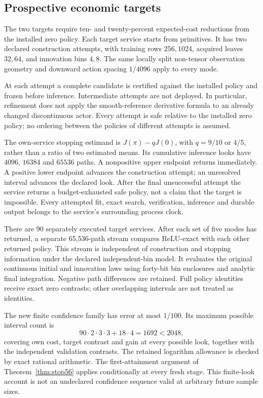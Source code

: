 \subsection{Prospective economic targets}
The two targets require ten- and twenty-percent expected-cost reductions from the installed zero policy. Each target service starts from primitives. It has two declared construction attempts, with training rows $256,1024$, acquired leaves $32,64$, and innovation bins $4,8$. The same locally split non-tensor observation geometry and downward action spacing $1/4096$ apply to every mode.

At each attempt a complete candidate is certified against the installed policy and frozen before inference. Intermediate attempts are not deployed. In particular, refinement does not apply the smooth-reference derivative formula to an already changed discontinuous actor. Every attempt is safe relative to the installed zero policy; no ordering between the policies of different attempts is assumed.

The own-service stopping estimand is $J(\pi)-qJ(0)$, with $q=9/10$ or $4/5$, rather than a ratio of two estimated means. Its cumulative inference looks have $4096$, $16384$ and $65536$ paths. A nonpositive upper endpoint returns immediately. A positive lower endpoint advances the construction attempt; an unresolved interval advances the declared look. After the final unsuccessful attempt the service returns a budget-exhausted safe policy, not a claim that the target is impossible. Every attempted fit, exact search, verification, inference and durable output belongs to the service's surrounding process clock.

There are 90 separately executed target services. After each set of five modes has returned, a separate 65,536-path stream compares ReLU-exact with each other returned policy. This stream is independent of construction and stopping information under the declared independent-bin model. It evaluates the original continuous initial and innovation laws using forty-bit bin enclosures and analytic final integration. Negative path differences are retained. Full policy identities receive exact zero contrasts; other overlapping intervals are not treated as identities.

The new finite confidence family has error at most $1/100$. Its maximum possible interval count is
\[
 90\cdot2\cdot3\cdot3+18\cdot4=1692<2048,
\]
covering own cost, target contrast and gain at every possible look, together with the independent validation contrasts. The retained logarithm allowance is checked by exact rational arithmetic. The first-attainment argument of Theorem~\ref{thm:stop56} applies conditionally at every fresh stage. This finite-look account is not an undeclared confidence sequence valid at arbitrary future sample sizes.

